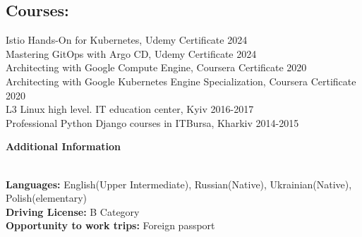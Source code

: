 \documentclass[letterpaper]{article}
\renewcommand{\section}[1]{
  {
    \large \colorbox{my-gray}{
      \begin{minipage}
        {\textwidth-0.175in}
        {\textbf{#1 \vphantom{p\^{E}}}}
      \end{minipage}
    }
  }
}
\begin{document}
\subsection{Courses:}
\label{sec-4-1-2}
Istio Hands-On for Kubernetes, Udemy Certificate 2024\\
Mastering GitOps with Argo CD, Udemy Certificate 2024\\
Architecting with Google Compute Engine, Coursera Certificate 2020\\
Architecting with Google Kubernetes Engine Specialization, Coursera Certificate 2020\\
L3 Linux high level. IT education center, Kyiv 2016-2017\\
Professional Python Django courses in ITBursa, Kharkiv 2014-2015
\vspace*{1em plus .6em minus .5em}
\section{Additional Information}
\vspace*{1em}\\
\textbf{Languages:}  English(Upper Intermediate), Russian(Native), Ukrainian(Native), Polish(elementary)\\
\textbf{Driving License:} B Category\\
\textbf{Opportunity to work trips:} Foreign passport\\
\end{document}
